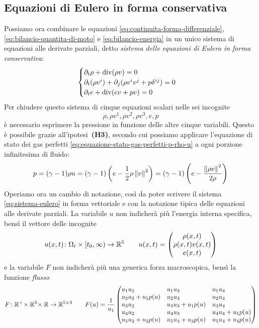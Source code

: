 \subsection*{Equazioni di Eulero in forma conservativa}

Possiamo ora combinare le equazioni
\eqref{eq:continuita-forma-differenziale},
\eqref{eq:bilancio-quantita-di-moto} e \eqref{eq:bilancio-energia}
in un unico sistema di equazioni alle derivate parziali,
detto \emph{sistema delle equazioni di Eulero in forma conservativa}:
\begin{equation} \label{eq:sistema-eulero}
\begin{cases}
\partial_t \rho + \operatorname{div}(\rho v) = 0 \\
\partial_t (\rho v^i) + \partial_j (\rho v^i v^j + p\delta^{ij}) = 0 \\
\partial_t e + \operatorname{div}(ev+pv) = 0
\end{cases}
\end{equation}
Per chiudere questo sistema di cinque equazioni scalari nelle sei incognite
\[
\rho, \rho v^1, \rho v^2, \rho v^3, e, p
\]
è necessario esprimere la pressione in funzione delle altre cinque variabili.
Questo è possibile grazie all'ipotesi~\textbf{(H3)}, secondo cui possiamo
applicare l'equazione di stato dei gas perfetti
\eqref{eq:equazione-stato-gas-perfetti-p-rho-u}
a ogni porzione infinitesima di fluido:
\[
p
= (\gamma-1) \rho u
= (\gamma-1) \left( e - \frac{1}{2} \rho \left\lVert v\right\rVert^2 \right)
= (\gamma-1) \left( e - \frac{\left\lVert\rho v\right\rVert^2}{2\rho} \right)
\]
Operiamo ora un cambio di notazione, così da poter
scrivere il sistema \eqref{eq:sistema-eulero} in forma vettoriale e
con la notazione tipica delle equazioni alle derivate parziali.
La variabile $u$ non indicherà più l'energia interna specifica,
bensì il vettore delle incognite
\[
u(x,t) \colon \Omega_t \times [t_0,\infty) \to \mathbb{R}^5
\qquad u(x,t) = \begin{pmatrix} \rho(x,t) \\ \rho(x,t) v(x,t) \\ e(x,t) \end{pmatrix}
\]
e la variabile $F$ non indicherà più una generica forza macroscopica,
bensì la funzione \emph{flusso}
\[
F \colon \R^+ \! \times \R^3 \! \times \R \to \R^{5 \times 3}
\qquad
F(u) =
\frac{1}{u_1}
\begin{pmatrix*}[l]
u_1 u_2            & u_1 u_3            & u_1 u_4            \\
u_2 u_2 + u_1 p(u) & u_2 u_3            & u_2 u_4            \\
u_3 u_2            & u_3 u_3 + u_1 p(u) & u_3 u_4            \\
u_4 u_2            & u_4 u_3            & u_4 u_4 + u_1 p(u) \\
u_5 u_2 + u_2 p(u) & u_5 u_3 + u_3 p(u) & u_5 u_4 + u_4 p(u)
\end{pmatrix*}
\]
